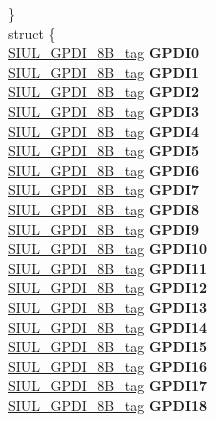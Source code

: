 \begin{DoxyCompactItemize}
\begin{tabbing}
\>\} \\
\mbox{\label{unionSIU__tag_1_1_0D1544_a44c21e252113b9aae31d0a276428d022}} 
\>struct \{\\
\>\>\mbox{\hyperlink{unionSIUL__GPDI__8B__tag}{SIUL\_GPDI\_8B\_tag}} {\bfseries GPDI0}\\
\>\>\mbox{\hyperlink{unionSIUL__GPDI__8B__tag}{SIUL\_GPDI\_8B\_tag}} {\bfseries GPDI1}\\
\>\>\mbox{\hyperlink{unionSIUL__GPDI__8B__tag}{SIUL\_GPDI\_8B\_tag}} {\bfseries GPDI2}\\
\>\>\mbox{\hyperlink{unionSIUL__GPDI__8B__tag}{SIUL\_GPDI\_8B\_tag}} {\bfseries GPDI3}\\
\>\>\mbox{\hyperlink{unionSIUL__GPDI__8B__tag}{SIUL\_GPDI\_8B\_tag}} {\bfseries GPDI4}\\
\>\>\mbox{\hyperlink{unionSIUL__GPDI__8B__tag}{SIUL\_GPDI\_8B\_tag}} {\bfseries GPDI5}\\
\>\>\mbox{\hyperlink{unionSIUL__GPDI__8B__tag}{SIUL\_GPDI\_8B\_tag}} {\bfseries GPDI6}\\
\>\>\mbox{\hyperlink{unionSIUL__GPDI__8B__tag}{SIUL\_GPDI\_8B\_tag}} {\bfseries GPDI7}\\
\>\>\mbox{\hyperlink{unionSIUL__GPDI__8B__tag}{SIUL\_GPDI\_8B\_tag}} {\bfseries GPDI8}\\
\>\>\mbox{\hyperlink{unionSIUL__GPDI__8B__tag}{SIUL\_GPDI\_8B\_tag}} {\bfseries GPDI9}\\
\>\>\mbox{\hyperlink{unionSIUL__GPDI__8B__tag}{SIUL\_GPDI\_8B\_tag}} {\bfseries GPDI10}\\
\>\>\mbox{\hyperlink{unionSIUL__GPDI__8B__tag}{SIUL\_GPDI\_8B\_tag}} {\bfseries GPDI11}\\
\>\>\mbox{\hyperlink{unionSIUL__GPDI__8B__tag}{SIUL\_GPDI\_8B\_tag}} {\bfseries GPDI12}\\
\>\>\mbox{\hyperlink{unionSIUL__GPDI__8B__tag}{SIUL\_GPDI\_8B\_tag}} {\bfseries GPDI13}\\
\>\>\mbox{\hyperlink{unionSIUL__GPDI__8B__tag}{SIUL\_GPDI\_8B\_tag}} {\bfseries GPDI14}\\
\>\>\mbox{\hyperlink{unionSIUL__GPDI__8B__tag}{SIUL\_GPDI\_8B\_tag}} {\bfseries GPDI15}\\
\>\>\mbox{\hyperlink{unionSIUL__GPDI__8B__tag}{SIUL\_GPDI\_8B\_tag}} {\bfseries GPDI16}\\
\>\>\mbox{\hyperlink{unionSIUL__GPDI__8B__tag}{SIUL\_GPDI\_8B\_tag}} {\bfseries GPDI17}\\
\>\>\mbox{\hyperlink{unionSIUL__GPDI__8B__tag}{SIUL\_GPDI\_8B\_tag}} {\bfseries GPDI18}\\

\end{tabbing}
\end{DoxyCompactItemize}
